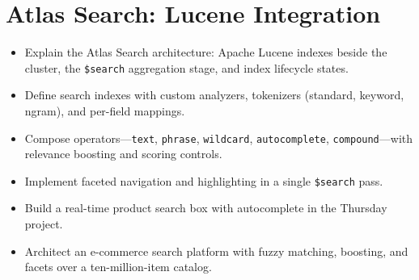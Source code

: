 \chapter{Atlas Search: Lucene Integration}
%

\begin{objectives}
\begin{itemize}
    \item Explain the Atlas Search architecture: Apache Lucene indexes beside the cluster, the \texttt{\$search} aggregation stage, and index lifecycle states.
    \item Define search indexes with custom analyzers, tokenizers (standard, keyword, ngram), and per-field mappings.
    \item Compose operators---\texttt{text}, \texttt{phrase}, \texttt{wildcard}, \texttt{autocomplete}, \texttt{compound}---with relevance boosting and scoring controls.
    \item Implement faceted navigation and highlighting in a single \texttt{\$search} pass.
    \item Build a real-time product search box with autocomplete in the Thursday project.
    \item Architect an e-commerce search platform with fuzzy matching, boosting, and facets over a ten-million-item catalog.
\end{itemize}
\end{objectives}

